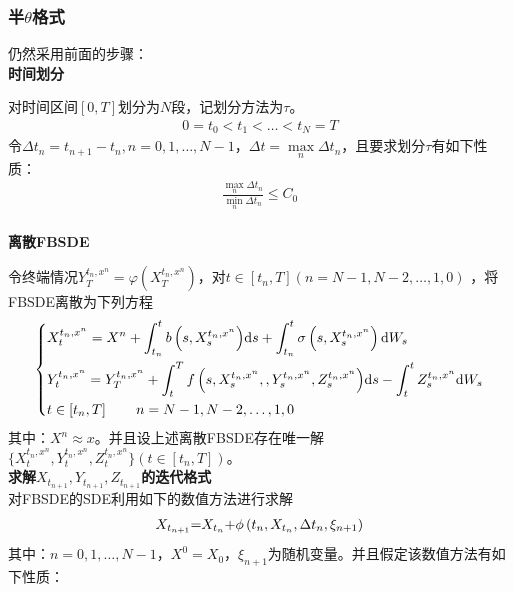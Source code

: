 		\subsubsection{半$\theta$格式}
			仍然采用前面的步骤：\\
			\textbf{时间划分}
			\par
			对时间区间$[0,T]$划分为$N$段，记划分方法为$\tau$。
			\begin{align*}
			0=t_0<t_1<\ldots<t_N=T\end{align*}
			令$\Delta t_n =t_{n+1}-t_n,n=0,1,\ldots,N-1$，$\Delta t =\mathop {\max }\limits_n \Delta {t_n}$，且要求划分$\tau$有如下性质：
			\begin{align*}
			\frac{{\mathop {\max }\limits_n \Delta {t_n}}}{{\mathop {\min }\limits_n \Delta {t_n}}} \leqslant {C_0}\end{align*}
			\\
			\textbf{离散FBSDE}
			\par
			令终端情况$Y_T^{{t_n},{x^n}} = \varphi \left( {X_T^{{t_n},{x^n}}} \right)$，对$t\in[t_n,T](n=N-1,N-2,\ldots,1,0)$ ，将FBSDE离散为下列方程
						\begin{equation*}
					\centering
						\left\{\begin{lgathered}
					{X_t^{{t_n},{x^n}} = {X^{n}} + \int_{{t_n}}^t {b\left( {s,X_s^{{t_n},{x^n}}} \right)} \mathrm{d}s + \int_{{t_n}}^t {\sigma \left( {s,X_s^{{t_n},{x^n}}} \right)\mathrm{d}{W_s}} }\\
					{Y_t^{{t_n},{x^n}} = Y_T^{{t_n},{x^n}} + \int_{{t}}^T {f\left( {s,X_s^{{t_n},{x^n}},,Y_s^{{t_n},{x^n}},Z_s^{{t_n},{x^n}}} \right)} \mathrm{d}s - \int_{{t}}^t {Z_s^{{t_n},{x^n}}\mathrm{d}{W_s}} }\\
					{t \in \left[ {{t_n},T} \right]\qquad n=N-1,N-2,\ldots,1,0}
			 			\end{lgathered} \right.
			 		\end{equation*}
			其中：$X^n\approx x$。并且设上述离散FBSDE存在唯一解
			$\{X_t^{t_n,x^n},Y_t^{t_n,x^n},Z_t^{t_n,x^n}\}(t\in[t_n,T]) $。
			\\
			\textbf{求解$X_{t_{n+1}},Y_{t_{n+1}},Z_{t_{n+1}}$的迭代格式}\\
			\checkmark 对FBSDE的SDE利用如下的数值方法进行求解
			\begin{align*}
			{X_{{t_{n{\rm{ + }}1}}}}{\rm{ = }}{X_{{t_n}}}{\rm{ + }}\phi \left( {{t_n},{X_{{t_n}}},\Delta {t_n},{\xi _{n+1}}} \right)\end{align*}
			其中：$n=0,1,\ldots,N-1$，$X^0=X_0$，$\xi_{n+1}$为随机变量。并且假定该数值方法有如下性质：
